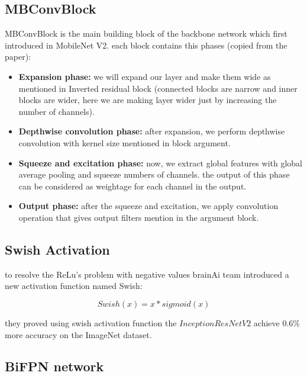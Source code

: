 \documentclass[11pt]{article}
\begin{document}
\subsection{MBConvBlock}

MBConvBlock is the main building block of the backbone network which first introduced in MobileNet V2. each block contains this phases (copied from the paper):

\begin{itemize}
	\item{\textbf{Expansion phase:} we will expand our layer and make them wide as mentioned in Inverted residual block (connected blocks are narrow and inner blocks are wider, here we are making layer wider just by increasing the number of channels).}
	
	\item{\textbf{Depthwise convolution phase:} after expansion, we perform depthwise convolution with kernel size mentioned in block argument.}
	
	\item{\textbf{Squeeze and excitation phase:} now, we extract global features with global average pooling and squeeze numbers of channels. the output of this phase can be considered as weightage for each channel in the output.}
	
	\item{\textbf{Output phase:} after the squeeze and excitation, we apply convolution operation that gives output filters mention in the argument block.}
\end{itemize}

\subsection{Swish Activation}

to resolve the ReLu's problem with negative values brainAi team introduced a new activation function named Swish:

\begin{equation}
	\label{eq:swish}
	\text{$Swish(x) = x * sigmoid(x)$}
\end{equation}

they proved using swish activation function the $InceptionResNetV2$ achieve 0.6\% more accuracy on the ImageNet dataset.

\subsection{BiFPN network}
\end{document}
